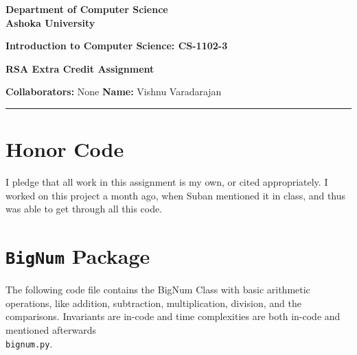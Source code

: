 \documentclass[a4paper]{article}
\begin{document}
\begin{center}
{\large \bf \color{red}  Department of Computer Science} \\
{\large \bf \color{red}  Ashoka University} \\

\vspace{0.1in}

{\large \bf \color{blue}  Introduction to Computer Science: CS-1102-3}

\vspace{0.05in}

    { \bf \color{YellowOrange} RSA Extra Credit Assignment}
\end{center}
\medskip

{\textbf{Collaborators:} None} \hfill {\textbf{Name:} Vishnu Varadarajan}

\bigskip
\hrule

\section{Honor Code}
I pledge that all work in this assignment is my own, or cited appropriately. I worked on this project a month ago, when Suban mentioned it in class, and thus was able to get through all this code. 

\section{\texttt{BigNum} Package}
The following code file contains the BigNum Class with basic arithmetic operations, like addition, subtraction, multiplication, division, and the comparisons. Invariants are in-code and time complexities are both in-code and mentioned afterwards \\ \texttt{bignum.py}.

\end{document}
